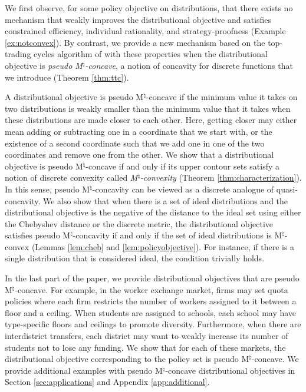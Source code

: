 \documentclass[12pt]{amsart}
\theoremstyle{remark}
\begin{document}
We first observe, for some policy objective on distributions, that there exists no mechanism that weakly improves the distributional objective and
satisfies constrained efficiency, individual rationality, and strategy-proofness (Example \ref{ex:notconvex}). By contrast, we provide a new
mechanism based on the top-trading cycles algorithm of \cite{shasca74} with these properties when the distributional objective is \emph{pseudo M$^{\natural}$-concave},
a notion of concavity for discrete functions that we introduce (Theorem \ref{thm:ttc}).


A distributional objective is pseudo M$^{\natural}$-concave if the minimum value it takes on two distributions is weakly smaller than the minimum value that it takes
when these distributions are made closer to each other. Here, getting closer may either mean adding or subtracting one in a coordinate that we start with,
or the existence of a second coordinate such that we add one in one of the two coordinates and remove one from the other. We show that
a distributional objective is pseudo M$^{\natural}$-concave if and only if its upper contour sets satisfy a notion of discrete convexity called
\emph{M$^{\natural}$-convexity} (Theorem \ref{thm:characterization}). In this sense, pseudo M$^{\natural}$-concavity can be viewed as a
discrete analogue of quasi-concavity. We also show that when there is a set of ideal
distributions and the distributional objective is the negative of the distance to the ideal set
using either the Chebyshev distance or the discrete metric, the distributional objective satisfies
pseudo M$^{\natural}$-concavity if and only if the set of ideal distributions is M$^{\natural}$-convex (Lemmas \ref{lem:cheb} and \ref{lem:policyobjective}).
For instance, if there is a single distribution that is considered ideal, the condition trivially holds.

In the last part of the paper, we provide distributional objectives that are pseudo M$^{\natural}$-concave.
For example, in the worker exchange market, firms may set quota policies where each firm restricts the number of
workers assigned to it between a floor and a ceiling. When students are assigned to schools, each school may have type-specific
floors and ceilings to promote diversity. Furthermore, when there are interdistrict transfers, each district may
want to weakly increase its number of students not to lose any funding. We show that for each of these markets, the distributional objective
corresponding to the policy set is pseudo M$^{\natural}$-concave. We provide additional examples
with pseudo M$^{\natural}$-concave distributional objectives in Section \ref{sec:applications} and Appendix \ref{app:additional}.
\end{document}
